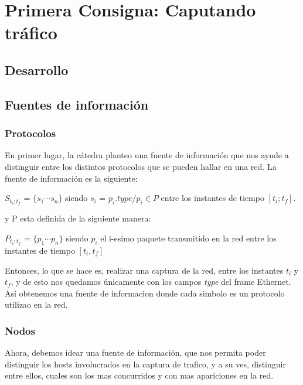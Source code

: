 \section{Primera Consigna: Caputando tr\'afico}\label{sec:metodos_1}

\subsection{Desarrollo}

\subsection{Fuentes de información}

\subsubsection{Protocolos}

En primer lugar, la cátedra planteo una fuente de información que nos ayude a distinguir entre los distintos protocolos que se pueden hallar en una red. La fuente de información es la siguiente:

\begin{center}
	$S_{t_i;t_f}$ = $\{s_1 \dotsb s_n\}$ siendo $s_i$ = $p_i.type / p_i \in P$ entre los instantes de tiempo $[t_i; t_f ]$.
\end{center}

y P esta definida de la siguiente manera:

\begin{center}
	$P_{t_i;t_f}$ = $\{p_1 \dotsb p_n\}$ siendo $p_i$ el i-esimo paquete transmitido en la red entre los instantes de tiempo $[t_i, t_f]$
\end{center}

Entonces, lo que se hace es, realizar una captura de la red, entre los instantes $t_i$ y $t_f$, y de esto nos quedamos únicamente con los campos \textit{type} del frame Ethernet. Así obtenemos una fuente de informacion donde cada simbolo es un protocolo utilizao en la red.

\subsubsection{Nodos}

Ahora, debemos idear una fuente de información, que nos permita poder distinguir los hosts involucrados en la captura de trafico, y a su ves, distinguir entre ellos, cuales son los mas concurridos y con mas apariciones en la red.\\

